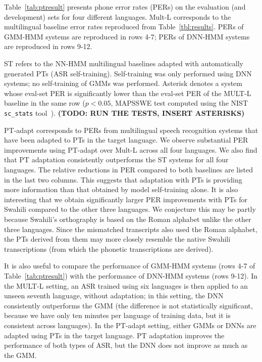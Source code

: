 Table~\ref{tab:ptresult} presents phone error rates (PERs) on the
evaluation (and development) sets for four different languages. {\sc
  Mult-L} corresponds to the multilingual baseline error rates
reproduced from Table~\ref{tbl:results}.  PERs of GMM-HMM systems are
reproduced in rows 4-7; PERs of DNN-HMM systems are reproduced in rows
9-12.

{\sc ST} refers to the NN-HMM multilingual baselines adapted with
automatically generated PTs (ASR self-training). Self-training was
only performed using DNN systems; no self-training of GMMs was
performed.  Asterisk denotes a system whose eval-set PER is
significantly lower than the eval-set PER of the MULT-L baseline in
the same row ($p<0.05$, MAPSSWE test computed using the NIST {\tt
  sc\_stats} tool~\cite{Pallet90}).  {\bf (TODO: RUN THE TESTS, INSERT
  ASTERISKS)}

{\sc PT-adapt} corresponds to PERs from multilingual speech
recognition systems that have been adapted to PTs in the target
language. We observe substantial PER improvements using {\sc PT-adapt}
over {\sc Mult-L} across all four languages. We also find that PT
adaptation consistently outperforms the {\sc ST} systems for all four
languages. The relative reductions in PER compared to both baselines
are listed in the last two columns.  This suggests that
adaptation with PTs is providing more information than that obtained
by model self-training alone. It is also interesting that we obtain
significantly larger PER improvements with PTs for Swahili compared to
the other three languages. We conjecture this may be partly because
Swahili's orthography is based on the Roman alphabet unlike the other
three languages. Since the mismatched transcripts also used the Roman
alphabet, the PTs derived from them may more closely resemble the
native Swahili transcriptions (from which the phonetic transcriptions
are derived).

It is also useful to compare the performance of GMM-HMM systems (rows
4-7 of Table~\ref{tab:ptresult}) with the performance of DNN-HMM
systems (rows 9-12).  In the {\sc MULT-L} setting, an ASR trained
using six languages is then applied to an unseen seventh language,
without adaptation; in this setting, the DNN consistently outperforms
the GMM (the difference is not statistically significant, because we
have only ten minutes per language of training data, but it is
consistent across languages).  In the {\sc PT-adapt} setting, either
GMMs or DNNs are adapted using PTs in the target language.  PT
adaptation improves the performance of both types of ASR, but the DNN
does not improve as much as the GMM.


